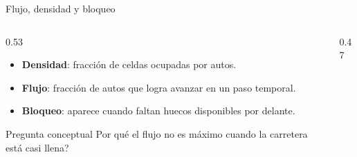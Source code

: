 \begin{frame}{Flujo, densidad y bloqueo}
\begin{columns}[T]
\begin{column}{0.53\textwidth}
\begin{itemize}
    \item \textbf{Densidad}: fracción de celdas ocupadas por autos.
    \item \textbf{Flujo}: fracción de autos que logra avanzar en un paso temporal.
    \item \textbf{Bloqueo}: aparece cuando faltan huecos disponibles por delante.
\end{itemize}

\begin{alertblock}{Pregunta conceptual}
\textquestiondown Por qué el flujo no es máximo cuando la carretera está casi llena?
\end{alertblock}
\end{column}
\begin{column}{0.47\textwidth}
\end{column}
\end{columns}
\end{frame}

